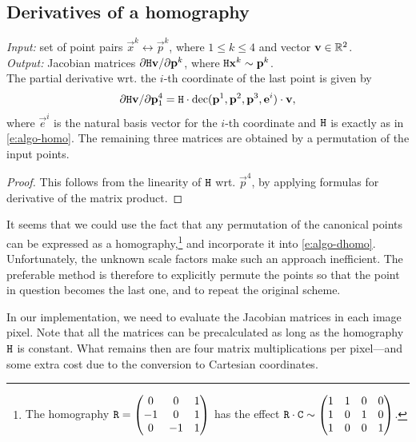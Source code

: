 \subsection{Derivatives of a homography}
\label{s:algo-dhomo}

\textit{Input:} set of point pairs $\vec x^k \leftrightarrow \vec p^k$, where $1 \leq k \leq 4$ and vector $\mathbf{v} \in \mathbb{R}^2$.\\
\textit{Output:} Jacobian matrices $\partial \mathtt{H} \mathbf{v} / \partial \mathbf{p}^k$, where $\mathtt{H} \mathbf{x}^k \sim \mathbf{p}^k$.\\

The partial derivative wrt. the $i$-th coordinate of the last point is given by
\begin{equation} \label{e:algo-dhomo}
\partial \mathtt{H} \mathbf{v} / \partial \mathbf{p}^4_1 = \mathtt{H} \cdot \mathrm{dec}(\mathbf{p}^1, \mathbf{p}^2, \mathbf{p}^3, \mathbf{e}^i) \cdot \mathbf{v},
\end{equation}
where $\vec e^i$ is the natural basis vector for the $i$-th coordinate and $\mathtt{H}$ is exactly as in \eqref{e:algo-homo}.
The remaining three matrices are obtained by a permutation of the input points.

\begin{proof}
This follows from the linearity of $\mathtt{H}$ wrt. $\vec p^4$, by applying formulas for derivative of the matrix product.
\end{proof}

It seems that we could use the fact that any permutation of the canonical points can be expressed as a homography,\footnote{
The homography $\mathtt{R} = \begin{pmatrix}
 0 & 0 & 1 \\
 -1 & 0 & 1 \\
 0 & -1 & 1
 \end{pmatrix}$ has the effect $\mathtt{R} \cdot \mathtt{C} \sim \begin{pmatrix}
 1 & 1 & 0 & 0 \\
 1 & 0 & 1 & 0 \\
 1 & 0 & 0 & 1
 \end{pmatrix}$.
} and incorporate it into \eqref{e:algo-dhomo}.
Unfortunately, the unknown scale factors make such an approach inefficient.
The preferable method is therefore to explicitly permute the points so that the point in question becomes the last one, and to repeat the original scheme.

In our implementation, we need to evaluate the Jacobian matrices in each image pixel.
Note that all the matrices can be precalculated as long as the homography $\mathtt{H}$ is constant.
What remains then are four matrix multiplications per pixel---and some extra cost due to the conversion to Cartesian coordinates.
